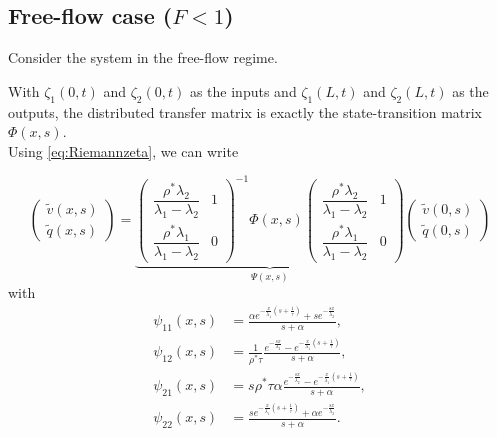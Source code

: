 \documentclass[preprint]{elsarticle}
\begin{document}
\subsection{Free-flow case ($F<1$)}
Consider the system in the free-flow regime. 

With $\zeta_1 (0,t)$ and $\zeta_2 (0,t)$ as the inputs and $\zeta_1(L,t)$ and $\zeta_2(L,t)$ as the outputs, the distributed transfer matrix is exactly the state-transition matrix $\Phi(x,s)$.\\

Using \eqref{eq:Riemannzeta}, we can write

\begin{equation} \label{vqfreeflow}
\begin{pmatrix}
\widetilde{v}(x,s) \\ \widetilde{q}(x,s)
\end{pmatrix} = \underbrace{ \begin{pmatrix}
\dfrac{\rho^*\lambda_2}{\lambda_1-\lambda_2} & 1\\
\dfrac{\rho^*\lambda_1}{\lambda_1-\lambda_2} & 0
\end{pmatrix}^{-1} \Phi(x,s) 
\begin{pmatrix}
\dfrac{\rho^*\lambda_2}{\lambda_1-\lambda_2} & 1\\
\dfrac{\rho^*\lambda_1}{\lambda_1-\lambda_2} & 0
\end{pmatrix} }_\text{$\Psi (x,s)$} \begin{pmatrix}
\widetilde{v}(0,s) \\ \widetilde{q}(0,s)
\end{pmatrix}
\end{equation}
with
\begin{subequations}
\begin{align}
\psi_{11}(x,s) &= 
\frac{
	\alpha e^{-\frac{x}{\lambda_{1}}\left(s+\frac{1}{\tau}\right)}
		+ s e^{-\frac{sx}{\lambda_{2}}}
}{
	s + \alpha
}, \\
\psi_{12}(x,s) &=
\frac{1}{\rho^* \tau}
\frac{
	e^{-\frac{sx}{\lambda_{2}}}
	-
	e^{-\frac{x}{\lambda_{1}}\left(s+\frac{1}		{\tau}\right)}
}{
	s + \alpha
}, \\
\psi_{21}(x,s) &=
s \rho^{*} \tau \alpha
\frac{
	e^{-\frac{sx}{\lambda_{2}}}
	-
	e^{-\frac{x}{\lambda_{1}}\left(s+\frac{1}		{\tau}\right)}
}{
	s + \alpha
}, \\
\psi_{22}(x,s) &=
\frac{
	s e^{-\frac{x}{\lambda_{1}}\left(s+\frac{1}{\tau}\right)}
		+ \alpha e^{-\frac{sx}{\lambda_{2}}}
}{
	s + \alpha
}.
\end{align}
\end{subequations}
\end{document}
